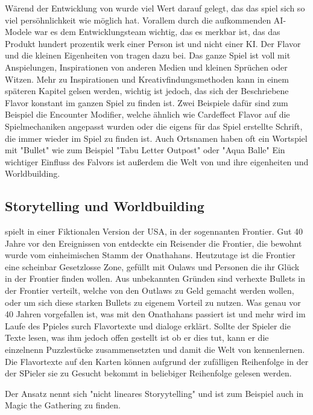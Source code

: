 Wärend der Entwicklung von \FF wurde viel Wert darauf gelegt, das das spiel sich so viel persöhnlichkeit wie möglich hat.
Vorallem durch die aufkommenden AI-Modele war es dem Entwicklungsteam wichtig, das es merkbar ist,
das das Produkt hundert prozentik werk einer Person ist und nicht einer KI.
Der Flavor und die kleinen Eigenheiten von \FF tragen dazu bei.
Das ganze Spiel ist voll mit Anspielungen, Inspirationen von anderen Medien und kleinen Sprüchen oder Witzen. Mehr zu Inspirationen und Kreativfindungsmethoden
kann in einem späteren Kapitel gelsen werden, wichtig ist jedoch, das sich der Beschriebene Flavor konstant im ganzen Spiel zu finden ist.
Zwei Beispiele dafür sind zum Beispiel die Encounter Modifier, welche ähnlich wie Cardeffect Flavor auf die Spielmechaniken
angepasst wurden oder die eigens für das Spiel erstellte Schrift, die immer wieder im Spiel zu finden ist. Auch Ortsnamen
haben oft ein Wortspiel mit "Bullet" wie zum Beispiel "Tabu Letter Outpost" oder "Aqua Balle"
Ein wichtiger Einfluss des Falvors ist außerdem die Welt von \FF und ihre eigenheiten und Worldbuilding.



\subsection{Storytelling und Worldbuilding}\label{subsec:storytellingUndWorldbuilding}

\FF spielt in einer Fiktionalen Version der USA, in der sogennanten Frontier. Gut 40 Jahre vor den Ereignissen von \FF entdeckte
ein Reisender die Frontier, die bewohnt wurde vom einheimischen Stamm der Onathahans. Heutzutage ist die Frontier eine
scheinbar Gesetzlosse Zone, gefüllt mit Oulaws und Personen die ihr Glück in der Frontier finden wollen. Aus unbekannten
Gründen sind verhexte Bullets in der Frontier verteilt, welche von den Outlaws zu Geld gemacht werden wollen,
oder um sich diese starken Bullets zu eigenem Vorteil zu nutzen. Was genau vor 40 Jahren vorgefallen ist,
was mit den Onathahans passiert ist und mehr wird im Laufe des Ppieles surch Flavortexte und dialoge erklärt.
Sollte der Spieler die Texte lesen, was ihm jedoch offen gestellt ist ob er dies tut, kann er die einzelnenn Puzzlestücke
zusammensetzten und damit die Welt von \FF kennenlernen. Die Flavortexte auf den Karten können aufgrund der
zufälligen Reihenfolge in der der SPieler sie zu Gesucht bekommt in beliebiger Reihenfolge gelesen werden. 


Der Ansatz nennt sich "nicht lineares Storyytelling" und ist zum Beispiel auch in Magic the Gathering zu finden.\cite{nonlinearstorytelling}


